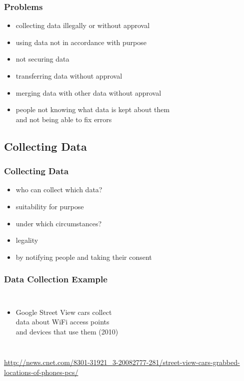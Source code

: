 \documentclass[dvipsnames]{beamer}
\theoremstyle{plain}
\begin{document}
\begin{frame}
  \frametitle{Problems}

  \begin{itemize}
    \item collecting data illegally or without approval
    \item using data not in accordance with purpose
    \item not securing data
    \item transferring data without approval
    \item merging data with other data without approval
    \item people not knowing what data is kept about them\\
      and not being able to fix errors
  \end{itemize}
\end{frame}

\subsection{Collecting Data}

\begin{frame}
  \frametitle{Collecting Data}

  \begin{itemize}
    \item who can collect which data?
    \item suitability for purpose

    \pause
    \bigskip
    \item under which circumstances?
    \item legality
    \item by notifying people and taking their consent
  \end{itemize}
\end{frame}

\begin{frame}
  \frametitle{Data Collection Example}

  \begin{columns}

    \begin{itemize}
      \item Google Street View cars collect\\
        data about WiFi access points\\
        and devices that use them (2010)
    \end{itemize}
  \end{columns}

  \medskip
  \tiny{\url{http://news.cnet.com/8301-31921_3-20082777-281/street-view-cars-grabbed-locations-of-phones-pcs/}}\\
\end{frame}
\end{document}
